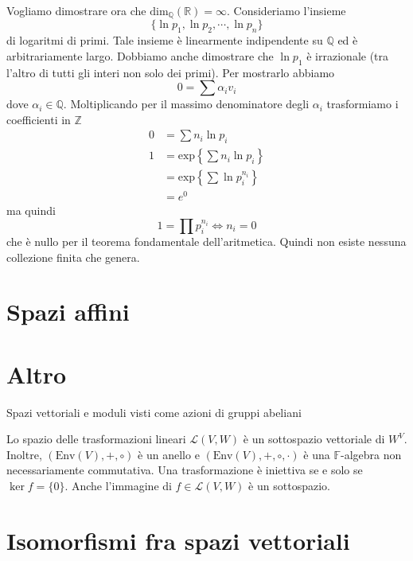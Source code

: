 \documentclass[a4paper]{article}
\begin{document}
Vogliamo dimostrare ora che \(\text{dim}_{\mathbb{Q}}(\mathbb{R}) = \infty\).
Consideriamo l'insieme
\[
    \{
        \ln p_1, \ln p_2, \cdots, \ln p_n    
    \}
\]
di logaritmi di primi. Tale insieme è linearmente indipendente su \(\mathbb{Q}\)
ed è arbitrariamente largo.
Dobbiamo anche dimostrare che \(\ln p_1\) è irrazionale (tra l'altro di tutti gli interi non solo dei primi).
Per mostrarlo abbiamo
\[
    0 = \sum \alpha_i v_i
\]
dove \(\alpha_i \in \mathbb{Q}\).
Moltiplicando per il massimo denominatore degli \(\alpha_i\)
trasformiamo i coefficienti in \(\mathbb{Z}\)
\begin{align*}
    0 &= \sum n_i \ln p_i \\
    1 &= \text{exp}\left\{
        \sum n_i \ln p_i
    \right\} \\
    &= \text{exp}\left\{
        \sum \ln p_i^{n_i}
    \right\} \\
    &= e^0
\end{align*}
ma quindi
\[
    1 = \prod p_i^{n_i} \iff n_i = 0
\]
che è nullo per il teorema fondamentale dell'aritmetica.
Quindi non esiste nessuna collezione finita che genera.

\pagebreak

\section{Spazi affini}


\section{Altro}

Spazi vettoriali e moduli visti come azioni di gruppi abeliani

Lo spazio delle trasformazioni lineari \(\mathcal{L}(V, W)\) è un sottospazio vettoriale
di \(W^V\). Inoltre, \((\text{Env}(V), +, \circ)\) è un anello
e \((\text{Env}(V), +, \circ, \cdot)\) è una \(\mathbb{F}\)-algebra non necessariamente commutativa.
Una trasformazione è iniettiva se e solo se \(\ker f = \{0\}\).
Anche l'immagine di \(f \in \mathcal{L}(V, W)\) è un sottospazio.

\section{Isomorfismi fra spazi vettoriali}
\end{document}
